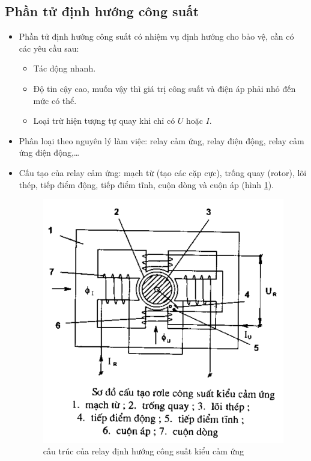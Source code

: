 \documentclass[12pt,a4paper]{article}
\begin{document}
\subsection{Phần tử định hướng công suất}	
	\begin{itemize}
		\item Phần tử định hướng công suất có nhiệm vụ định hướng cho bảo vệ, cần có các yêu cầu sau:
			\begin{itemize}
				\item Tác động nhanh.
				
				\item Độ tin cậy cao, muốn vậy thì giá trị công suất và điện áp phải nhỏ đến mức có thể.
				
				\item Loại trừ hiện tượng tự quay khi chỉ có $U$ hoặc $I$.				
			\end{itemize}
			
		\item Phân loại theo nguyên lý làm việc: relay cảm ứng, relay điện động, relay cảm ứng điện động,\ldots
		
		\item Cấu tạo của relay cảm ứng: mạch từ (tạo các cặp cực), trống quay (rotor), lõi thép, tiếp điểm động, tiếp điểm tĩnh, cuộn dòng và cuộn áp (hình \ref{Fig:cautao-relay-dinhhuongcongsuat}).				
		
			\begin{figure}[!h]
				\begin{center}					
					\includegraphics[scale=.45]{images/relay-dinhhuong-cuongsuat.png} 
				\end{center}
				\caption{cấu trúc của relay định hướng công suất kiểu cảm ứng} \label{Fig:cautao-relay-dinhhuongcongsuat}
			\end{figure}
	

\end{itemize}
\end{document}
